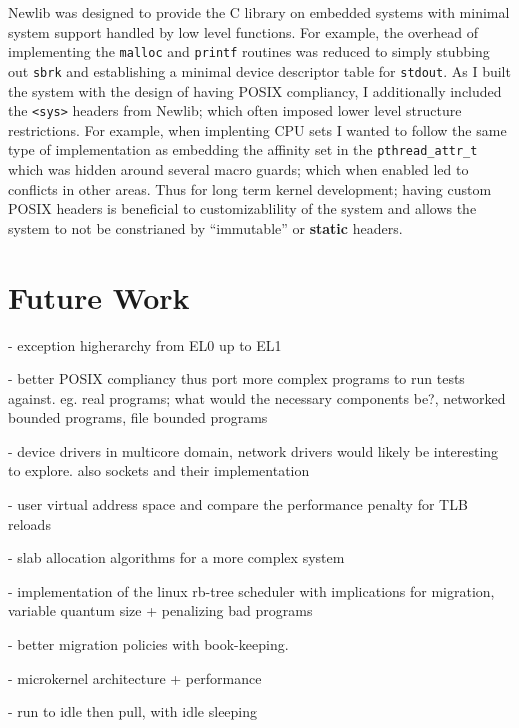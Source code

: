\documentclass[11pt]{article}
\begin{document}
Newlib was designed to provide the C library on embedded systems \cite{newlib} with minimal system support handled by low level functions.  For example, the overhead of implementing the \texttt{malloc} and \texttt{printf} routines was reduced to simply stubbing out \texttt{sbrk} and establishing a minimal device descriptor table for \texttt{stdout}.  As I built the system with the design of having POSIX compliancy, I additionally included the \texttt{<sys>} headers from Newlib; which often imposed lower level structure restrictions.  For example, when implenting CPU sets I wanted to follow the same type of implementation as embedding the affinity set in the \texttt{pthread\_attr\_t} which was hidden around several macro guards; which when enabled led to conflicts in other areas.  Thus for long term kernel development; having custom POSIX headers is beneficial to customizablility of the system and allows the system to not be constrianed by ``immutable'' or \textbf{static} headers.

\section{Future Work}
\label{sec:future}
- exception higherarchy from EL0 up to EL1

- better POSIX compliancy thus port more complex programs to run tests against.
eg. real programs; what would the necessary components be?, networked bounded programs, file bounded programs

- device drivers in multicore domain, network drivers would likely be interesting to explore.  also sockets and their implementation

- user virtual address space and compare the performance penalty for TLB reloads

- slab allocation algorithms for a more complex system

- implementation of the linux rb-tree scheduler with implications for migration, variable quantum size + penalizing bad programs

- better migration policies with book-keeping.

- microkernel architecture + performance

- run to idle then pull, with idle sleeping


\onecolumn
\begin{sloppypar}
	
	
\end{sloppypar}

\end{document}
